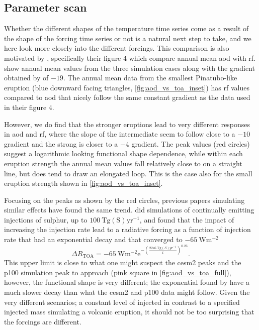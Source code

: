 \documentclass{ametsocV5}
\newcommand{\iso}[1][i]{{#1}njected \ce{SO2}}
\begin{document}
\subsection{Parameter scan}

Whether the different shapes of the temperature time series come as a result of the
shape of the forcing time series or not is a natural next step to take, and we here look
more closely into the different forcings. This comparison is also motivated by
\citet{gregory2016}, specifically their figure 4 which compare annual mean \acrfull{aod}
with \acrfull{rf}.  show annual mean values from the three
simulation cases along with the gradient obtained by \citet{gregory2016} of \(-19\). The
annual mean data from the smallest Pinatubo-like eruption (blue downward facing
triangles, \cref{fig:aod_vs_toa_inset}) has \acrshort{rf} values compared to
\acrshort{aod} that nicely follow the same constant gradient as the \citet{gregory2016}
data used in their figure 4.

However, we do find that the stronger eruptions lead to very different responses in
\acrshort{aod} and \acrshort{rf}, where the slope of the intermediate seem to follow
close to a \( -10 \) gradient and the strong is closer to a \( -4 \) gradient. The peak
values (red circles) suggest a logarithmic looking functional shape dependence, while
within each eruption strength the annual mean values fall relatively close to on a
straight line, but does tend to draw an elongated loop. This is the case also for the
small eruption strength shown in \cref{fig:aod_vs_toa_inset}.

Focusing on the peaks as shown by the red circles, previous papers simulating similar
effects have found the same trend. \citet{niemeier2015} did simulations of continually
emitting injections of sulphur, up to \( \SI{100}{\tera\gram
  \mathrm{(S)}\mathrm{yr}^{-1}} \), and found that the impact of increasing the injection
rate lead to a radiative forcing as a function of injection rate that had an exponential
decay and that converged to \( \SI{-65}{\watt\meter^{-2}} \)
\begin{equation}
  \Delta
  R_{\mathrm{TOA}} =
  -\SI{65}{\watt\metre^{-2}}
  \mathrm{e}^{-\left(\frac{\SI{2246}{\tera\gram(S)yr^{-1}}}{x}\right)^{0.23}}.
  \label{eq:niemeier_exponential}
\end{equation}
%
This upper limit is close to what one might suspect the \acrshort{cesm2} peaks and the
\acrfull{p100} simulation peak to approach (pink square in \cref{fig:aod_vs_toa_full}),
however, the functional shape is very different; the exponential found by
\citet{niemeier2015} have a much slower decay than what the \acrshort{cesm2} and
\acrshort{p100} data might follow. Given the very different scenarios; a constant level
of \iso{} in contrast to a specified injected mass simulating a volcanic eruption, it
should not be too surprising that the forcings are different.
\end{document}
